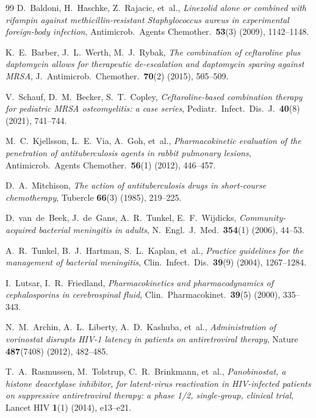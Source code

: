 \documentclass[11pt]{article}
\theoremstyle{plain}
\theoremstyle{definition}
\begin{document}
\begin{thebibliography}{99}
D.~Baldoni, H.~Haschke, Z.~Rajacic, et~al.,
\textit{Linezolid alone or combined with rifampin against
methicillin-resistant Staphylococcus aureus in experimental
foreign-body infection},
Antimicrob.\ Agents Chemother.\ \textbf{53}(3) (2009), 1142--1148.

K.~E.~Barber, J.~L.~Werth, M.~J.~Rybak,
\textit{The combination of ceftaroline plus daptomycin allows for
therapeutic de-escalation and daptomycin sparing against MRSA},
J.~Antimicrob.\ Chemother.\ \textbf{70}(2) (2015), 505--509.

V.~Schauf, D.~M.~Becker, S.~T.~Copley,
\textit{Ceftaroline-based combination therapy for pediatric MRSA
osteomyelitis: a case series},
Pediatr.\ Infect.\ Dis.\ J.\ \textbf{40}(8) (2021), 741--744.

M.~C.~Kjellsson, L.~E.~Via, A.~Goh, et~al.,
\textit{Pharmacokinetic evaluation of the penetration of
antituberculosis agents in rabbit pulmonary lesions},
Antimicrob.\ Agents Chemother.\ \textbf{56}(1) (2012), 446--457.

D.~A.~Mitchison,
\textit{The action of antituberculosis drugs in short-course
chemotherapy},
Tubercle \textbf{66}(3) (1985), 219--225.

D.~van~de~Beek, J.~de~Gans, A.~R.~Tunkel, E.~F.~Wijdicks,
\textit{Community-acquired bacterial meningitis in adults},
N.~Engl.\ J.~Med.\ \textbf{354}(1) (2006), 44--53.

A.~R.~Tunkel, B.~J.~Hartman, S.~L.~Kaplan, et~al.,
\textit{Practice guidelines for the management of bacterial
meningitis},
Clin.\ Infect.\ Dis.\ \textbf{39}(9) (2004), 1267--1284.

I.~Lutsar, I.~R.~Friedland,
\textit{Pharmacokinetics and pharmacodynamics of cephalosporins
in cerebrospinal fluid},
Clin.\ Pharmacokinet.\ \textbf{39}(5) (2000), 335--343.

N.~M.~Archin, A.~L.~Liberty, A.~D.~Kashuba, et~al.,
\textit{Administration of vorinostat disrupts HIV-1 latency in
patients on antiretroviral therapy},
Nature \textbf{487}(7408) (2012), 482--485.

T.~A.~Rasmussen, M.~Tolstrup, C.~R.~Brinkmann, et~al.,
\textit{Panobinostat, a histone deacetylase inhibitor, for
latent-virus reactivation in HIV-infected patients on suppressive
antiretroviral therapy: a phase 1/2, single-group, clinical trial},
Lancet HIV \textbf{1}(1) (2014), e13--e21.


\end{thebibliography}
\end{document}
